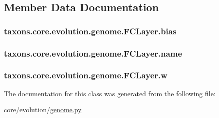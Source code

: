 \subsection{Member Data Documentation}
\subsubsection[{\texorpdfstring{bias}{bias}}]{\setlength{\rightskip}{0pt plus 5cm}taxons.\+core.\+evolution.\+genome.\+F\+C\+Layer.\+bias}\hypertarget{classtaxons_1_1core_1_1evolution_1_1genome_1_1_f_c_layer_a2485852ee4763243988e45ab2cc8b85f}{}\label{classtaxons_1_1core_1_1evolution_1_1genome_1_1_f_c_layer_a2485852ee4763243988e45ab2cc8b85f}
\subsubsection[{\texorpdfstring{name}{name}}]{\setlength{\rightskip}{0pt plus 5cm}taxons.\+core.\+evolution.\+genome.\+F\+C\+Layer.\+name}\hypertarget{classtaxons_1_1core_1_1evolution_1_1genome_1_1_f_c_layer_a22c79053734a3d92254ab60c11edf015}{}\label{classtaxons_1_1core_1_1evolution_1_1genome_1_1_f_c_layer_a22c79053734a3d92254ab60c11edf015}
\subsubsection[{\texorpdfstring{w}{w}}]{\setlength{\rightskip}{0pt plus 5cm}taxons.\+core.\+evolution.\+genome.\+F\+C\+Layer.\+w}\hypertarget{classtaxons_1_1core_1_1evolution_1_1genome_1_1_f_c_layer_a99275e28b13db55e585eff07ca0ed0a0}{}\label{classtaxons_1_1core_1_1evolution_1_1genome_1_1_f_c_layer_a99275e28b13db55e585eff07ca0ed0a0}


The documentation for this class was generated from the following file\+:\begin{DoxyCompactItemize}
\item 
core/evolution/\hyperlink{genome_8py}{genome.\+py}\end{DoxyCompactItemize}
